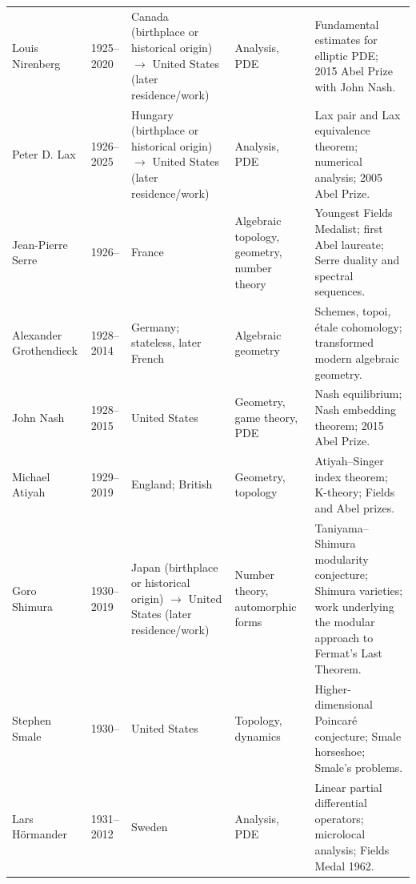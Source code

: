 {\begin{longtable}{@{}L{0.145\textwidth}L{0.09\textwidth}L{0.225\textwidth}L{0.14\textwidth}L{0.30\textwidth}@{}}
        Louis Nirenberg
        & 1925--2020
        & Canada (birthplace or historical origin) \(\to\) United States (later residence/work)
        & Analysis, PDE
        & Fundamental estimates for elliptic PDE; 2015 Abel Prize with John
          Nash. \\

        Peter D. Lax
        & 1926--2025
        & Hungary (birthplace or historical origin) \(\to\) United States (later residence/work)
        & Analysis, PDE
        & Lax pair and Lax equivalence theorem; numerical analysis; 2005 Abel
          Prize. \\

        Jean-Pierre Serre
        & 1926--
        & France
        & Algebraic topology, geometry, number theory
        & Youngest Fields Medalist; first Abel laureate; Serre duality and
          spectral sequences. \\

        Alexander Grothendieck
        & 1928--2014
        & Germany; stateless, later French
        & Algebraic geometry
        & Schemes, topoi, étale cohomology; transformed modern algebraic
          geometry. \\

        John Nash
        & 1928--2015
        & United States
        & Geometry, game theory, PDE
        & Nash equilibrium; Nash embedding theorem; 2015 Abel Prize. \\

        Michael Atiyah
        & 1929--2019
        & England; British
        & Geometry, topology
        & Atiyah--Singer index theorem; K-theory; Fields and Abel prizes. \\

        Goro Shimura
        & 1930--2019
        & Japan (birthplace or historical origin) \(\to\) United States (later residence/work)
        & Number theory, automorphic forms
        & Taniyama--Shimura modularity conjecture; Shimura varieties; work
          underlying the modular approach to Fermat's Last Theorem. \\

        Stephen Smale
        & 1930--
        & United States
        & Topology, dynamics
        & Higher-dimensional Poincaré conjecture; Smale horseshoe; Smale's
          problems. \\

        Lars Hörmander
        & 1931--2012
        & Sweden
        & Analysis, PDE
        & Linear partial differential operators; microlocal analysis; Fields
          Medal 1962. \\


\end{longtable}}
